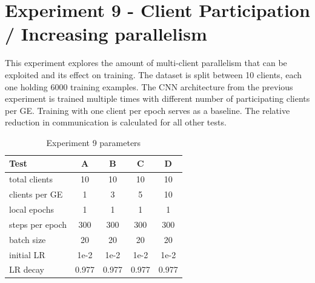 \section{Experiment 9 - Client Participation / Increasing parallelism}
This experiment explores the amount of multi-client parallelism that can be exploited and its effect on training. The dataset is split between 10 clients, each one holding 6000 training examples. The CNN architecture from the previous experiment is trained multiple times with different number of participating clients per GE. Training with one client per epoch serves as a baseline. The relative reduction in communication is calculated for all other tests.
    
\begin{table}
    \center
    \begin{tabular}{ | l | c | c | c | c | }
        \hline
        Test & A & B & C & D\\\hline
        total clients   & 10 & 10 & 10 & 10\\\hline
        clients per GE  & 1 & 3 & 5 & 10\\\hline
        local epochs    & 1 & 1 & 1 & 1\\\hline
        steps per epoch & 300 & 300 & 300 & 300\\\hline
        batch size      & 20 & 20 & 20 & 20\\\hline
        initial LR      & 1e-2 & 1e-2 & 1e-2 & 1e-2\\\hline
        LR decay        & 0.977 & 0.977 & 0.977 & 0.977\\\hline
    \end{tabular}
    \caption{Experiment 9 parameters}
\end{table}
    
